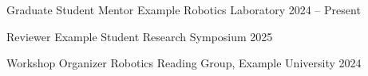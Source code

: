 
\VectraServiceEntry
    {Graduate Student Mentor}
    {Example Robotics Laboratory}
    {2024 -- Present}

\VectraServiceEntry
    {Reviewer}
    {Example Student Research Symposium}
    {2025}

\VectraServiceEntry
    {Workshop Organizer}
    {Robotics Reading Group, Example University}
    {2024}